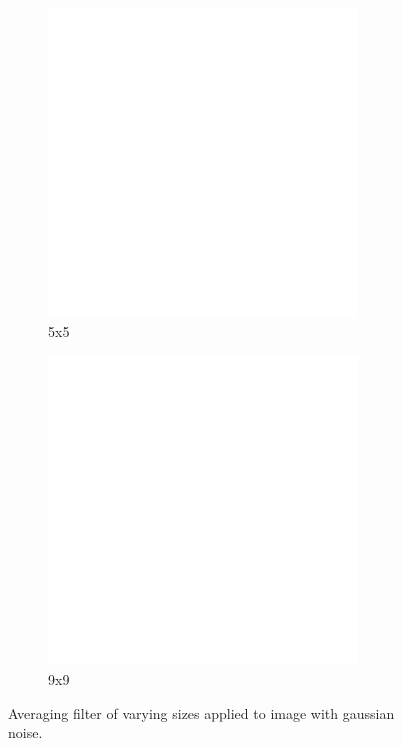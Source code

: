 \begin{figure}[h]
    \begin{subfigure}[b]{0.3\textwidth}
        \includegraphics[width=0.9\textwidth]{../code/2_out/2-1_gaus_5x5.png}
        \caption{5x5}
        \label{fig:2-1-2:3}
    \end{subfigure}
    \begin{subfigure}[b]{0.3\textwidth}
        \includegraphics[width=0.9\textwidth]{../code/2_out/2-1_gaus_9x9.png}
        \caption{9x9}
        \label{fig:2-1-2:4}
    \end{subfigure}

    \caption{Averaging filter of varying sizes applied to image with gaussian noise.}
    \label{fig:2-1-2}
\end{figure}
